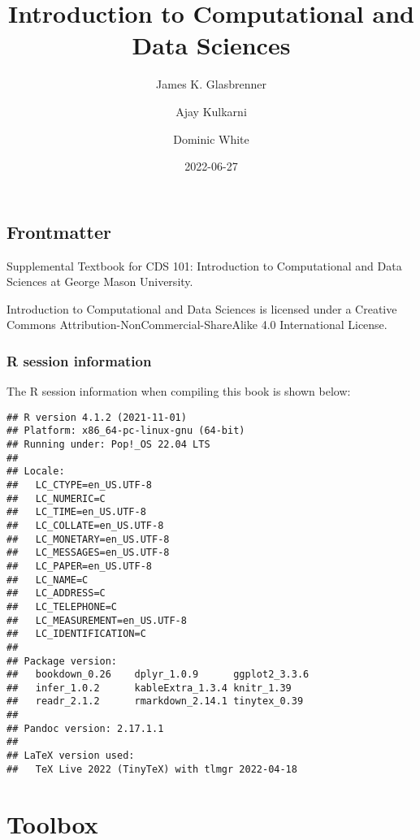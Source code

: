 \documentclass[
]{book}
\title{Introduction to Computational and Data Sciences}
\author{James K. Glasbrenner \and Ajay Kulkarni \and Dominic White}
\date{2022-06-27}
\begin{document}
\maketitle

{
\setcounter{tocdepth}{1}
\tableofcontents
}
\hypertarget{frontmatter}{%
\chapter*{Frontmatter}\label{frontmatter}}

Supplemental Textbook for CDS 101: Introduction to Computational and Data Sciences at George Mason University.

{Introduction to Computational and Data Sciences} is licensed under a Creative Commons Attribution-NonCommercial-ShareAlike 4.0 International License.

\hypertarget{r-session-information}{%
\section*{R session information}\label{r-session-information}}

The R session information when compiling this book is shown below:

\begin{verbatim}
## R version 4.1.2 (2021-11-01)
## Platform: x86_64-pc-linux-gnu (64-bit)
## Running under: Pop!_OS 22.04 LTS
## 
## Locale:
##   LC_CTYPE=en_US.UTF-8      
##   LC_NUMERIC=C              
##   LC_TIME=en_US.UTF-8       
##   LC_COLLATE=en_US.UTF-8    
##   LC_MONETARY=en_US.UTF-8   
##   LC_MESSAGES=en_US.UTF-8   
##   LC_PAPER=en_US.UTF-8      
##   LC_NAME=C                 
##   LC_ADDRESS=C              
##   LC_TELEPHONE=C            
##   LC_MEASUREMENT=en_US.UTF-8
##   LC_IDENTIFICATION=C       
## 
## Package version:
##   bookdown_0.26    dplyr_1.0.9      ggplot2_3.3.6   
##   infer_1.0.2      kableExtra_1.3.4 knitr_1.39      
##   readr_2.1.2      rmarkdown_2.14.1 tinytex_0.39    
## 
## Pandoc version: 2.17.1.1
## 
## LaTeX version used: 
##   TeX Live 2022 (TinyTeX) with tlmgr 2022-04-18
\end{verbatim}

\hypertarget{part-toolbox}{%
\part{Toolbox}\label{part-toolbox}}
\end{document}
